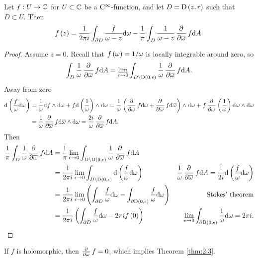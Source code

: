\begin{proposition}
Let $ f : U \to \mathbb{C} $ for $ U \subset \mathbb{C} $ be a $ \mathrm{C}^\infty $-function, and let $ D = \D\br{z, r} $ such that $ \overline{D} \subset U $. Then
$$ f\br{z} = \dfrac{1}{2\pi i}\int_{\da D} \dfrac{f}{\omega - z}\d\omega - \dfrac{1}{\pi}\int_D \dfrac{1}{\omega - z}\dpd{}{\overline{\omega}}f\d A. $$
\end{proposition}

\begin{proof}
Assume $ z = 0 $. Recall that $ f\br{\omega} = 1 / \omega $ is locally integrable around zero, so
$$ \int_D \dfrac{1}{\omega}\dpd{}{\overline{\omega}}f\d A = \lim_{\epsilon \to 0} \int_{D \setminus \D\br{0, \epsilon}} \dfrac{1}{\omega}\dpd{}{\overline{\omega}}f\d A. $$
Away from zero
\begin{align*}
\d\br{\dfrac{f}{\omega}\d\omega}
& = \dfrac{1}{\omega}\d f \wedge \d\omega + f\d\br{\dfrac{1}{\omega}} \wedge \d\omega
= \dfrac{1}{\omega} \br{\dpd{}{\omega}f\d\omega + \dpd{}{\overline{\omega}}f\d\overline{\omega}} \wedge \d\omega + f\dpd{}{\omega}\br{\dfrac{1}{\omega}}\d\omega \wedge \d\omega \\
& = \dfrac{1}{\omega}\dpd{}{\overline{\omega}}f\d\overline{\omega} \wedge \d\omega
= \dfrac{2i}{\omega}\dpd{}{\overline{\omega}}f\d A.
\end{align*}
Then
\begin{align*}
\dfrac{1}{\pi}\int_D \dfrac{1}{\omega}\dpd{}{\overline{\omega}}f\d A
& = \dfrac{1}{\pi}\lim_{\epsilon \to 0} \int_{D \setminus \D\br{0, \epsilon}} \dfrac{1}{\omega}\dpd{}{\overline{\omega}}f\d A \\
& = \dfrac{1}{2\pi i}\lim_{\epsilon \to 0} \int_{D \setminus \D\br{0, \epsilon}}\d\br{\dfrac{f}{\omega}\d\omega} & \dfrac{1}{\omega}\dpd{}{\overline{\omega}}f\d A = \dfrac{1}{2i}\d\br{\dfrac{f}{\omega}\d\omega} \\
& = \dfrac{1}{2\pi i}\lim_{\epsilon \to 0} \br{\int_{\da D} \dfrac{f}{\omega}\d\omega - \int_{\da\D\br{0, \epsilon}} \dfrac{f}{\omega}\d\omega} & \text{Stokes' theorem} \\
& = \dfrac{1}{2\pi i}\br{\int_{\da D} \dfrac{f}{\omega}\d\omega - 2\pi if\br{0}} & \lim_{\epsilon \to 0} \int_{\da\D\br{0, \epsilon}} \dfrac{1}{\omega}\d\omega = 2\pi i.
\end{align*}
\end{proof}

If $ f $ is holomorphic, then $ \tpd{}{\overline{\omega}}f = 0 $, which implies Theorem \ref{thm:2.3}.

